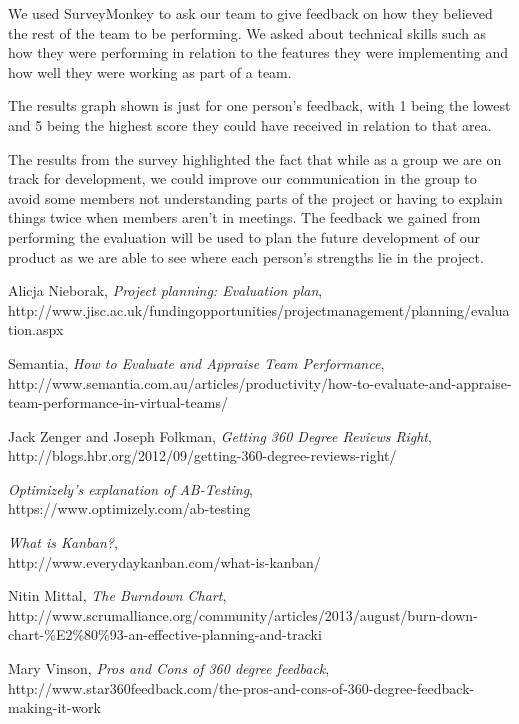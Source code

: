 \documentclass[10pt, a4paper]{article}
\begin{document}
We used SurveyMonkey to ask our team to give feedback on how they believed the rest of the team to be performing. We asked about technical skills such as how they were performing in relation to the features they were implementing and how well they were working as part of a team.

The results graph shown is just for one person’s feedback, with 1 being the lowest and 5 being the highest score they could have received in relation to that area.

The results from the survey highlighted the fact that while as a group we are on track for development, we could improve our communication in the group to avoid some members not understanding parts of the project or having to explain things twice when members aren’t in meetings. The feedback we gained from performing the evaluation will be used to plan the future development of our product as we are able to see where each person’s strengths lie in the project.

\begin{thebibliography}{9}

  Alicja Nieborak, 
  \emph{Project planning: Evaluation plan},
  \\ http://www.jisc.ac.uk/fundingopportunities/projectmanagement/planning/evaluation.aspx
 
  Semantia, 
  \emph{How to Evaluate and Appraise Team Performance},
  \\ http://www.semantia.com.au/articles/productivity/how-to-evaluate-and-appraise-team-performance-in-virtual-teams/

  Jack Zenger and Joseph Folkman, 
  \emph{Getting 360 Degree Reviews Right}, 
  \\ http://blogs.hbr.org/2012/09/getting-360-degree-reviews-right/

  \emph{Optimizely’s explanation of AB-Testing},
  \\ https://www.optimizely.com/ab-testing

  \emph{What is Kanban?},
  \\ http://www.everydaykanban.com/what-is-kanban/
  
  Nitin Mittal, 
  \emph{The Burndown Chart}, 
  \\ http://www.scrumalliance.org/community/articles/2013/august/burn-down-chart-{\%}E2{\%}80{\%}93-an-effective-planning-and-tracki
  
  Mary Vinson, 
  \emph{Pros and Cons of 360 degree feedback}, 
  \\ http://www.star360feedback.com/the-pros-and-cons-of-360-degree-feedback-making-it-work

\end{thebibliography}
\end{document}
